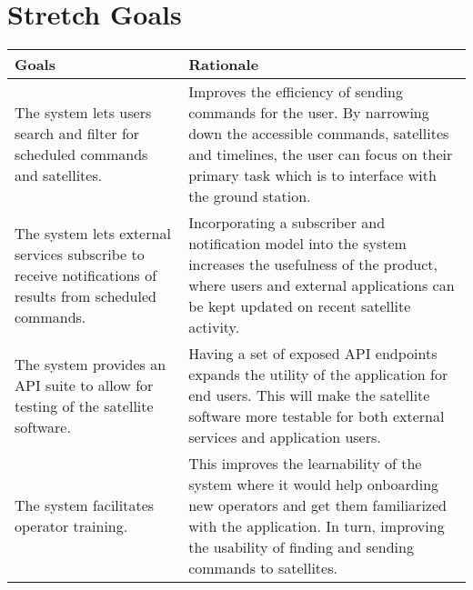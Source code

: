 \documentclass{article}
\begin{document}
\section{Stretch Goals}
\setlength{\arrayrulewidth}{0.5mm}
\setlength{\tabcolsep}{18pt}
\renewcommand{\arraystretch}{1.5}
\begin{tabular}{ | m{4cm} | m{8cm} | } 
\hline
  \textbf{Goals} & \textbf{Rationale} \\ 
  \hline
  The system lets users search and filter for scheduled commands and satellites. & Improves the efficiency of sending commands for the user. By narrowing down the accessible commands, satellites and timelines, the user can focus on their primary task which is to interface with the ground station. \\ 
  \hline
  The system lets external services subscribe to receive notifications of results from scheduled commands. & Incorporating a subscriber and notification model into the system increases the usefulness of the product, where users and external applications can be kept updated on recent satellite activity. \\ 
  \hline
  The system provides an API suite to allow for testing of the satellite software. & Having a set of exposed API endpoints expands the utility of the application for end users. This will make the satellite software more testable for both external services and application users.  \\ 
  \hline
 The system facilitates operator training. & This improves the learnability of the system where it would help onboarding new operators and get them familiarized with the application. In turn, improving the usability of finding and sending commands to satellites. \\ 
    \hline

\end{tabular}
\end{document}
